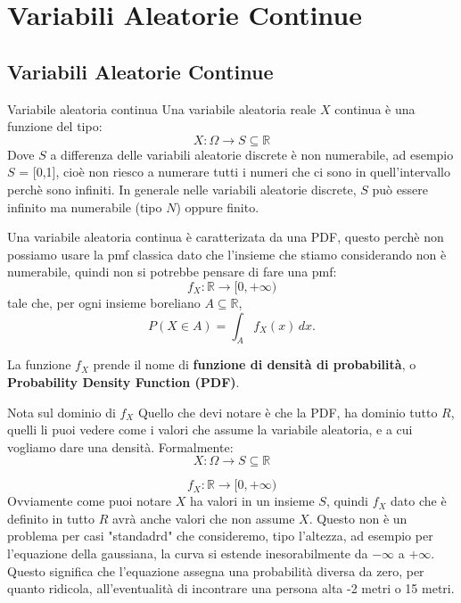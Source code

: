 
\chapter{Variabili Aleatorie Continue}
\section{Variabili Aleatorie Continue}
\begin{definition}{Variabile aleatoria continua}
Una variabile aleatoria reale $X$ continua è una funzione del tipo:
\[
X:\Omega\rightarrow S\subseteq\mathbb{R}
\]
Dove $S$ a differenza delle variabili aleatorie discrete è non numerabile, ad esempio $S$ = [0,1], cioè non riesco a numerare tutti i numeri che ci sono in quell'intervallo perchè sono infiniti.
In generale nelle variabili aleatorie discrete, $S$ può essere infinito ma numerabile (tipo $N$) oppure finito.


Una variabile aleatoria continua è caratterizata da una PDF, questo perchè non possiamo usare la pmf classica dato che l'insieme che stiamo considerando non è numerabile, quindi non si potrebbe pensare di fare una pmf:
\[
f_X:\mathbb{R}\longrightarrow[0,+\infty)
\]
tale che, per ogni insieme boreliano
$A\subseteq\mathbb{R}$,
\[
\boxed{
P(X\in A)=\int_A f_X(x)\,dx.
}
\]

La funzione $f_X$ prende il nome di
\textbf{funzione di densità di probabilità},
o \textbf{Probability Density Function (PDF)}.
\end{definition}

\begin{observation}{Nota sul dominio di $f_X$}
    Quello che devi notare è che la PDF, ha dominio tutto $R$, quelli li puoi vedere come i valori che assume la variabile aleatoria, e a cui vogliamo dare una densità.
    Formalmente:
    \[
    X:\Omega\longrightarrow S\subseteq\mathbb R
    \]

    \[
    f_X:\mathbb R\longrightarrow[0,+\infty)
    \]
    Ovviamente come puoi notare $X$ ha valori in un insieme $S$, quindi $f_X$ dato che è definito in tutto $R$ avrà anche valori che non assume $X$. 
    Questo non è un problema per casi "standadrd" che consideremo, tipo l'altezza, ad esempio per l'equazione della gaussiana, la curva si estende inesorabilmente da $-\infty$ a $+\infty$. Questo significa che l'equazione assegna una probabilità diversa da zero, per quanto ridicola, all'eventualità di incontrare una persona alta -2 metri o 15 metri.
\end{observation}


